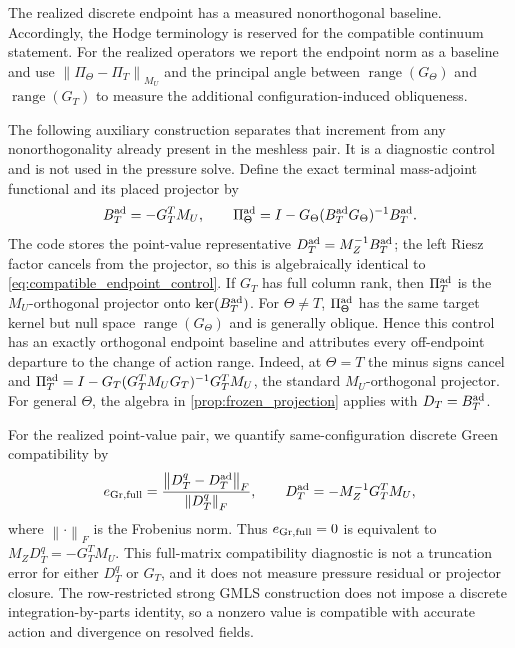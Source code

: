 \documentclass[11pt]{article}
\theoremstyle{plain}
\theoremstyle{definition}
\theoremstyle{remark}
\newcommand{\range}{\operatorname{range}}
\newcommand{\Th}{\Theta}
\newcommand{\norm}[2][]{\left\lVert #2\right\rVert_{#1}}
\begin{document}
The realized discrete endpoint has a measured nonorthogonal baseline.
Accordingly, the Hodge terminology is reserved for the compatible continuum
statement.  For the realized operators we report the endpoint norm as a
baseline and use
$\norm[M_U]{\Pi_\Th-\Pi_T}$ and the principal angle between
$\range(G_\Th)$ and $\range(G_T)$ to measure the additional
configuration-induced obliqueness.

The following auxiliary construction separates that increment from any
nonorthogonality already present in the meshless pair.  It is a diagnostic
control and is not used in the pressure solve.  Define the exact terminal
mass-adjoint functional and its placed projector by
\begin{equation}
 B_T^{\rm ad}=-G_T^TM_U,
 \qquad
 \Pi_\Th^{\rm ad}
 =I-G_\Th(B_T^{\rm ad}G_\Th)^{-1}B_T^{\rm ad}.
 \label{eq:compatible_endpoint_control}
\end{equation}
The code stores the point-value representative
$D_T^{\rm ad}=M_Z^{-1}B_T^{\rm ad}$; the left Riesz factor cancels from the
projector, so this is algebraically identical to
\eqref{eq:compatible_endpoint_control}.
If $G_T$ has full column rank, then $\Pi_T^{\rm ad}$ is the $M_U$-orthogonal
projector onto $\ker(B_T^{\rm ad})$.  For $\Th\ne T$,
$\Pi_\Th^{\rm ad}$ has the same target kernel but null space
$\range(G_\Th)$ and is generally oblique.  Hence this control has an exactly
orthogonal endpoint baseline and attributes every off-endpoint departure to
the change of action range.
Indeed, at $\Th=T$ the minus signs cancel and
$\Pi_T^{\rm ad}=I-G_T(G_T^TM_UG_T)^{-1}G_T^TM_U$, the standard
$M_U$-orthogonal projector.  For general $\Th$, the algebra in
\cref{prop:frozen_projection} applies with $D_T=B_T^{\rm ad}$.

For the realized point-value pair, we quantify same-configuration discrete
Green compatibility by
\begin{equation}
 e_{{\rm Gr},{\rm full}}
 =\frac{\norm[F]{D_T^q-D_T^{\rm ad}}}
        {\norm[F]{D_T^q}},
 \qquad
 D_T^{\rm ad}=-M_Z^{-1}G_T^TM_U,
 \label{eq:full_space_green_compatibility}
\end{equation}
where $\norm[F]{\cdot}$ is the Frobenius norm.  Thus
$e_{{\rm Gr},{\rm full}}=0$ is equivalent to
$M_ZD_T^q=-G_T^TM_U$.  This full-matrix compatibility diagnostic is not a
truncation error for either $D_T^q$ or $G_T$, and it does not measure pressure
residual or projector closure.  The row-restricted strong GMLS construction
does not impose a discrete integration-by-parts identity, so a nonzero value is
compatible with accurate action and divergence on resolved fields.
\end{document}
